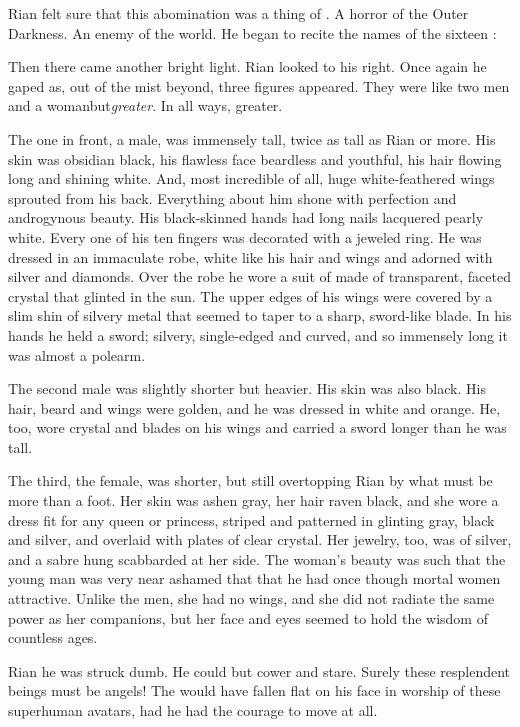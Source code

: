 Rian felt sure that this abomination was a thing of \Isphet. 
A horror of the Outer Darkness. 
An enemy of the world. 
He began to recite the names of the sixteen \sephiroth:
\tho{\Atzirah, \Razilah, \Keshirah, \Feazirah\prikker}

Then there came another bright light. 
Rian looked to his right.
Once again he gaped as, out of the mist beyond, three figures appeared. 
They were like \humans{}\dash two men and a woman\dash but\prikker \emph{greater}. 
In all ways, greater. 

The one in front, a male, was immensely tall, twice as tall as Rian or more. 
His skin was obsidian black, his flawless face beardless and youthful, his hair flowing long and shining white. 
And, most incredible of all, huge white-feathered wings sprouted from his back. 
Everything about him shone with perfection and androgynous beauty. 
His black-skinned hands had long nails lacquered pearly white. 
Every one of his ten fingers was decorated with a jeweled ring. 
He was dressed in an immaculate robe, white like his hair and wings and adorned with silver and diamonds. 
Over the robe he wore a suit of \armour made of transparent, faceted crystal that glinted in the sun. 
The upper edges of his wings were covered by a slim shin of silvery metal that seemed to taper to a sharp, sword-like blade. 
In his hands he held a sword; silvery, single-edged and curved, and so immensely long it was almost a polearm. 

The second male was slightly shorter but heavier. 
His skin was also black. 
His hair, beard and wings were golden, and he was dressed in white and orange. 
He, too, wore crystal \armour and blades on his wings and carried a sword longer than he was tall. 

The third, the female, was shorter, but still overtopping Rian by what must be more than a foot. 
Her skin was ashen gray, her hair raven black, and she wore a dress fit for any queen or princess, striped and patterned in glinting gray, black and silver, and overlaid with plates of clear crystal. 
Her jewelry, too, was of silver, and a sabre hung scabbarded at her side. 
The woman's beauty was such that the young man was very near ashamed that that he had once though mortal women attractive. 
Unlike the men, she had no wings, and she did not radiate the same power as her companions, but her face and eyes seemed to hold the wisdom of countless ages. 

Rian he was struck dumb. He could but cower and stare. 
Surely these resplendent beings must be angels! 
The \human{} would have fallen flat on his face in worship of these superhuman avatars, had he had the courage to move at all.

